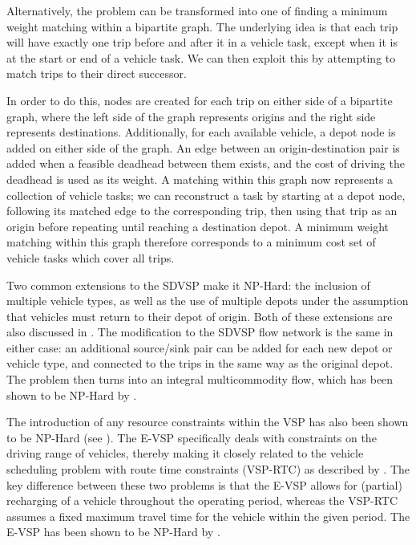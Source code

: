 \documentclass[]{article}
\begin{document}
Alternatively, the problem can be transformed into one of finding a minimum weight matching within a bipartite graph. The underlying idea is that each trip will have exactly one trip before and after it in a vehicle task, except when it is at the start or end of a vehicle task. We can then exploit this by attempting to match trips to their direct successor.

In order to do this, nodes are created for each trip on either side of a bipartite graph, where the left side of the graph represents origins and the right side represents destinations. Additionally, for each available vehicle, a depot node is added on either side of the graph. An edge between an origin-destination pair is added when a feasible deadhead between them exists, and the cost of driving the deadhead is used as its weight. A matching within this graph now represents a collection of vehicle tasks; we can reconstruct a task by starting at a depot node, following its matched edge to the corresponding trip, then using that trip as an origin before repeating until reaching a destination depot. A minimum weight matching within this graph therefore corresponds to a minimum cost set of vehicle tasks which cover all trips.

Two common extensions to the SDVSP make it NP-Hard: the inclusion of multiple vehicle types, as well as the use of multiple depots under the assumption that vehicles must return to their depot of origin. Both of these extensions are also discussed in \citet{Bunte2009}. The modification to the SDVSP flow network is the same in either case: an additional source/sink pair can be added for each new depot or vehicle type, and connected to the trips in the same way as the original depot. The problem then turns into an integral multicommodity flow, which has been shown to be NP-Hard by \citet{Even1975}.

The introduction of any resource constraints within the VSP has also been shown to be NP-Hard (see \citet{Bodin1983}). The E-VSP specifically deals with constraints on the driving range of vehicles, thereby making it closely related to the vehicle scheduling problem with route time constraints (VSP-RTC) as described by \citet{Haghani2002}. The key difference between these two problems is that the E-VSP allows for (partial) recharging of a vehicle throughout the operating period, whereas the VSP-RTC assumes a fixed maximum travel time for the vehicle within the given period. The E-VSP has been shown to be NP-Hard by \citet{Sassi2014}. \\
\end{document}
